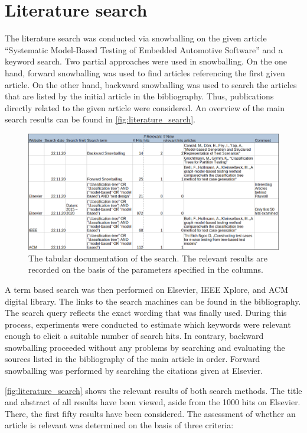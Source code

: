 \section{Literature search}

The literature search was conducted via snowballing on the given article \enquote{Systematic Model-Based Testing of Embedded Automotive Software} and a keyword search. Two partial approaches were used in snowballing. On the one hand, forward snowballing was used to find articles referencing the first given article. On the other hand, backward snowballing was used to search the articles that are listed by the initial article in the bibliography. Thus, publications directly related to the given article were considered. An overview of the main search results can be found in \autoref{fig:literature_search}. 

\begin{figure}[H]
\centering
\includegraphics[scale=0.32]{../images/Suchdokumentation_v2.png} 
\caption{The tabular documentation of the search. The relevant results are recorded on the basis of the parameters specified in the columns.}
\label{fig:literature_search}
\end{figure}

A term based search was then performed on Elsevier, IEEE Xplore, and ACM digital library. The links to the search machines can be found in the bibliography. The search query reflects the exact wording that was finally used. During this process, experiments were conducted to estimate which keywords were relevant enough to elicit a suitable number of search hits. In contrary, backward snowballing proceeded without any problems by searching and evaluating the sources listed in the bibliography of the main article in order. Forward snowballing was performed by searching the citations given at Elsevier.

\autoref{fig:literature_search} shows the relevant results of both search methods. The title and abstract of all results have been viewed, aside from the 1000 hits on Elsevier. There, the first fifty results have been considered. The assessment of whether an article is relevant was determined on the basis of three criteria:

